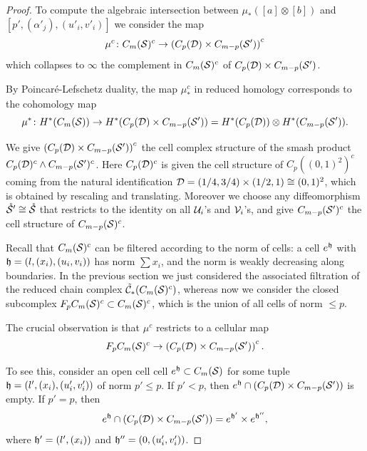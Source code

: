 \begin{proof}
% 

To compute the algebraic intersection
between $\mu_*([a]\otimes [b])$ and $[p',(\alpha'_j),(u'_i,v'_i)]$ we
consider the map
\[
 \mu^c\colon \cms^c\to \pa{C_p(\D)\times C_{m-p}(\S')}^c
\]
which collapses to $\infty$ the complement in $\cms^c$ of $C_p(\D)\times C_{m-p}(\S')$.

By Poincaré-Lefschetz duality, the map $\mu^c_*$ in reduced homology corresponds to the cohomology map
\[
 \mu^*\colon H^*(\cms)\to H^*(C_p(\D)\times C_{m-p}(\S'))=H^*(C_p(\D))\otimes H^*(C_{m-p}(\S')).
\]

We give $\pa{C_p(\D)\times C_{m-p}(\S')}^c$ the cell complex structure of the smash product
$C_p(\D)^c\wedge C_{m-p}(\S')^c$. Here $C_p(\D)^c$ is given the cell structure of $C_p((0,1)^2)^c$
coming from the natural identification $\D=(1/4,3/4)\times(1/2,1)\cong(0,1)^2$, which is obtained by rescaling
and translating. Moreover we choose any diffeomorphism $\mrS'\cong\mrS$ that restricts to the identity
on all $\U_i$'s and $\V_i$'s, and give $C_{m-p}(\S')^c$ the cell structure of $C_{m-p}(\S)^c$.

Recall that $\cms^c$ can be filtered according to the norm of cells: a cell $e^{\tup}$ with
$\tup=(l,(x_i),(u_i,v_i))$ has norm $\sum x_i$, and the norm is weakly decreasing along boundaries.
In the previous section we just considered
the associated filtration of the reduced chain complex $\tCh_*(\cms^c)$, whereas now we
consider the closed subcomplex $F_p\cms^c\subset\cms^c$, which is the union
of all cells of norm $\leq p$.

The crucial observation is that $\mu^c$ restricts to a cellular map 
\[
F_p\cms^c\to \pa{C_p(\D)\times C_{m-p}(\S')}^c.
\]

To see this, consider an open cell
cell $e^{\tup}\subset\cms$ for some tuple $\tup=(l', (x_i),(u'_i,v'_i))$ of norm $p'\leq p$.
If $p'<p$, then
$e^{\tup}\cap (C_p(\D)\times C_{m-p}(\S'))$ is empty. If $p'=p$, then
\[
e^{\tup}\cap (C_p(\D)\times C_{m-p}(\S'))=e^{\tup'}\times e^{\tup''},
\]
where $\tup'=(l',(x_i))$ and $\tup''=(0,(u'_i,v'_i))$.


\end{proof}
